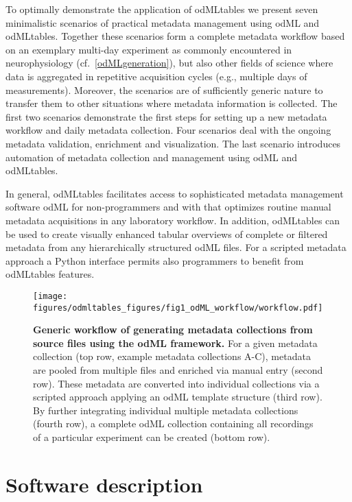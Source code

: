 To optimally demonstrate the application of odMLtables we present seven minimalistic scenarios of practical metadata management using odML and odMLtables. Together these scenarios form a complete metadata workflow based on an exemplary multi-day experiment as commonly encountered in neurophysiology (cf.~\cref{odMLgeneration}), but also other fields of science where data is aggregated in repetitive acquisition cycles (e.g., multiple days of measurements). Moreover, the scenarios are of sufficiently generic nature to transfer them to other situations where metadata information is collected. The first two scenarios demonstrate the first steps for setting up a new metadata workflow and daily metadata collection. Four scenarios deal with the ongoing metadata validation, enrichment and visualization. The last scenario introduces automation of metadata collection and management using odML and odMLtables.

In general, odMLtables facilitates access to sophisticated metadata management software odML for non-programmers and with that optimizes routine manual metadata acquisitions in any laboratory workflow. In addition, odMLtables can be used to create visually enhanced tabular overviews of complete or filtered metadata from any hierarchically structured odML files. For a scripted metadata approach a Python interface permits also programmers to benefit from odMLtables features.

\begin{figure}[h!]
\begin{center}
\texttt{[image: figures/odmltables\_figures/fig1\_odML\_workflow/workflow.pdf]}
\caption{{\label{fig:odMLgeneration}
\textbf{Generic workflow of generating metadata collections from source files using the odML framework.} For a given metadata collection (top row, example metadata collections A-C), metadata are pooled from multiple files and enriched via manual entry (second row). These metadata are converted into individual collections via a scripted approach applying an odML template structure (third row). By further integrating individual multiple metadata collections (fourth row), a complete odML collection containing all recordings of a particular experiment can be created (bottom row).
}}
\end{center}
\end{figure}

\section{Software description}
\label{sec:Software}

